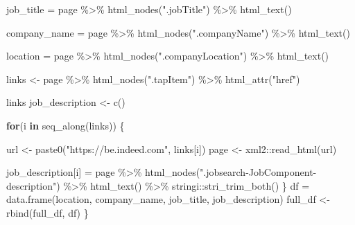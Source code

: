 \documentclass[
]{article}
\newenvironment{Shaded}{\begin{snugshade}}{\end{snugshade}}
\newcommand{\ControlFlowTok}[1]{\textcolor[rgb]{0.13,0.29,0.53}{\textbf{#1}}}
\newcommand{\FunctionTok}[1]{\textcolor[rgb]{0.00,0.00,0.00}{#1}}
\newcommand{\NormalTok}[1]{#1}
\newcommand{\OtherTok}[1]{\textcolor[rgb]{0.56,0.35,0.01}{#1}}
\newcommand{\SpecialCharTok}[1]{\textcolor[rgb]{0.00,0.00,0.00}{#1}}
\newcommand{\StringTok}[1]{\textcolor[rgb]{0.31,0.60,0.02}{#1}}
\begin{document}
\begin{Shaded}
\begin{Highlighting}[]
\NormalTok{  job\_title }\OtherTok{=}\NormalTok{ page }\SpecialCharTok{\%\textgreater{}\%} 
    \FunctionTok{html\_nodes}\NormalTok{(}\StringTok{".jobTitle"}\NormalTok{) }\SpecialCharTok{\%\textgreater{}\%} 
    \FunctionTok{html\_text}\NormalTok{()}
    
\NormalTok{  company\_name }\OtherTok{=}\NormalTok{ page }\SpecialCharTok{\%\textgreater{}\%} 
    \FunctionTok{html\_nodes}\NormalTok{(}\StringTok{".companyName"}\NormalTok{) }\SpecialCharTok{\%\textgreater{}\%} 
    \FunctionTok{html\_text}\NormalTok{()}
  
\NormalTok{  location }\OtherTok{=}\NormalTok{ page }\SpecialCharTok{\%\textgreater{}\%} 
    \FunctionTok{html\_nodes}\NormalTok{(}\StringTok{".companyLocation"}\NormalTok{) }\SpecialCharTok{\%\textgreater{}\%} 
    \FunctionTok{html\_text}\NormalTok{()}
  
\NormalTok{  links }\OtherTok{\textless{}{-}}\NormalTok{ page }\SpecialCharTok{\%\textgreater{}\%} 
    \FunctionTok{html\_nodes}\NormalTok{(}\StringTok{".tapItem"}\NormalTok{) }\SpecialCharTok{\%\textgreater{}\%} 
    \FunctionTok{html\_attr}\NormalTok{(}\StringTok{"href"}\NormalTok{)}
  
\NormalTok{  links}
\NormalTok{  job\_description }\OtherTok{\textless{}{-}} \FunctionTok{c}\NormalTok{()}
  
  \ControlFlowTok{for}\NormalTok{(i }\ControlFlowTok{in} \FunctionTok{seq\_along}\NormalTok{(links)) \{}
    
\NormalTok{    url }\OtherTok{\textless{}{-}} \FunctionTok{paste0}\NormalTok{(}\StringTok{"https://be.indeed.com"}\NormalTok{, links[i])}
\NormalTok{    page }\OtherTok{\textless{}{-}}\NormalTok{ xml2}\SpecialCharTok{::}\FunctionTok{read\_html}\NormalTok{(url)}
    
\NormalTok{    job\_description[i] }\OtherTok{=}\NormalTok{ page }\SpecialCharTok{\%\textgreater{}\%} 
      \FunctionTok{html\_nodes}\NormalTok{(}\StringTok{".jobsearch{-}JobComponent{-}description"}\NormalTok{) }\SpecialCharTok{\%\textgreater{}\%} 
      \FunctionTok{html\_text}\NormalTok{() }\SpecialCharTok{\%\textgreater{}\%} 
\NormalTok{      stringi}\SpecialCharTok{::}\FunctionTok{stri\_trim\_both}\NormalTok{()}
\NormalTok{  \}}
\NormalTok{  df }\OtherTok{=} \FunctionTok{data.frame}\NormalTok{(location, company\_name, job\_title, job\_description)}
\NormalTok{  full\_df }\OtherTok{\textless{}{-}} \FunctionTok{rbind}\NormalTok{(full\_df, df)}
\NormalTok{\}}
\end{Highlighting}
\end{Shaded}
\end{document}
